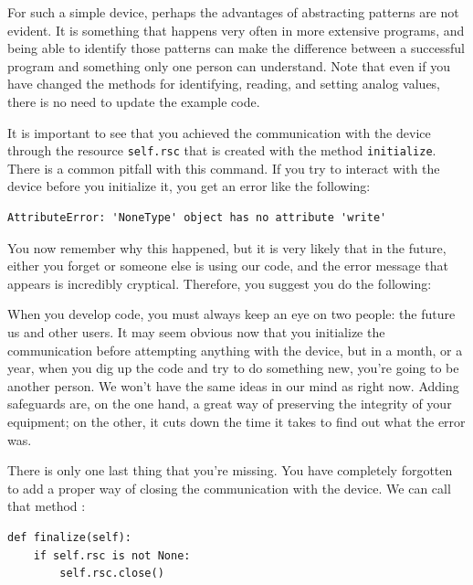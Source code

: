 For such a simple device, perhaps the advantages of abstracting patterns are not evident. It is something that happens very often in more extensive programs, and being able to identify those patterns can make the difference between a successful program and something only one person can understand. Note that even if you have changed the methods for identifying, reading, and setting analog values, there is no need to update the example code.

It is important to see that you achieved the communication with the device through the resource \texttt{self.rsc} that is created with the method \texttt{initialize}. There is a common pitfall with this command. If you try to interact with the device before you initialize it, you get an error like the following:

\begin{verbatim}
AttributeError: 'NoneType' object has no attribute 'write'
\end{verbatim}

You now remember why this happened, but it is very likely that in the future, either you forget or someone else is using our code, and the error message that appears is incredibly cryptical. Therefore, you suggest you do the following:


When you develop code, you must always keep an eye on two people: the future us and other users. It may seem obvious now that you initialize the communication before attempting anything with the device, but in a month, or a year, when you dig up the code and try to do something new, you're going to be another person. We won't have the same ideas in our mind as right now. Adding safeguards are, on the one hand, a great way of preserving the integrity of your equipment; on the other, it cuts down the time it takes to find out what the error was.

There is only one last thing that you're missing. You have completely forgotten to add a proper way of closing the communication with the device. We can call that method :

\begin{verbatim}
def finalize(self):
    if self.rsc is not None:
        self.rsc.close()
\end{verbatim}

